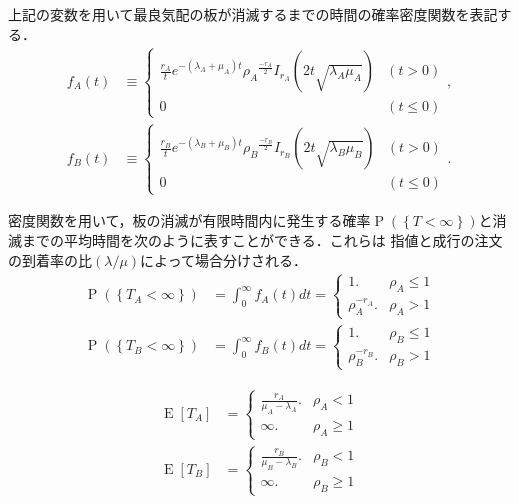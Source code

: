 \documentclass[a4j,papersize,disablejfam,slide,14pt]{jsarticle}
\def\Exp#1{\operatorname{E} \left[ #1 \right]} %
\def\exp#1{e^{#1}} %
\def\prob#1{\operatorname{P} \left(\left\{ #1 \right\}\right)} %
\begin{document}
    上記の変数を用いて最良気配の板が消滅するまでの時間の確率密度関数を表記する．
    \begin{align}
    	f_A(t) &\equiv 
        \begin{cases}
        		\frac{r_A}{t} \exp{-(\lambda_A + \mu_A)t} {\rho_A}^{\frac{-r_A}{2}} I_{r_A}(2t\sqrt{\lambda_A \mu_A}) & (t > 0) \\
            	0 & (t \leq 0)
        \end{cases},\\
        f_B(t) &\equiv 
        \begin{cases}
        		\frac{r_B}{t} \exp{-(\lambda_B + \mu_B)t} {\rho_B}^{\frac{-r_B}{2}} I_{r_B}(2t\sqrt{\lambda_B \mu_B}) & (t > 0) \\
            	0 & (t \leq 0)
        \end{cases}.
    \end{align}
    
    密度関数を用いて，板の消滅が有限時間内に発生する確率$\prob{T < \infty}$と消滅までの平均時間を次のように表すことができる．これらは
    指値と成行の注文の到着率の比$(\lambda/\mu)$によって場合分けされる．
    \begin{align}
    	\prob{T_A < \infty} &= \int_{0}^{\infty} f_A(t) dt =
        \begin{cases}
        	1. & \rho_A \leq 1  \\
            \rho_A^{-r_A}. & \rho_A > 1
        \end{cases} \\
        \prob{T_B < \infty} &= \int_{0}^{\infty} f_B(t) dt =
        \begin{cases}
        	1. & \rho_B \leq 1  \\
            \rho_B^{-r_B}. & \rho_B > 1
        \end{cases}
    \end{align}
    
    \begin{align}
    	\Exp{T_A} &= \begin{cases}
        	\frac{r_A}{\mu_A - \lambda_A}. & \rho_A < 1 \\
        	\infty. & \rho_A \geq 1
        \end{cases}\\
        \Exp{T_B} &= \begin{cases}
        	\frac{r_B}{\mu_B - \lambda_B}. & \rho_B < 1 \\
        	\infty. & \rho_B \geq 1
        \end{cases}
    \end{align}
    
\end{document}
